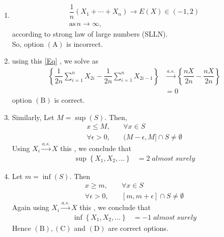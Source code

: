 \documentclass[journal,12pt,twocolumn]{IEEEtran}
\begin{document}
\begin{enumerate}[label=\alph*)]
\item\begin{align}
\dfrac{1}{n}\left(X_{1}+\cdots+X_{n}\right) \rightarrow E(X)\in(-1,2)\\
\text{as} \, n\rightarrow\infty,
\end{align}
according to strong law of large numbers (SLLN).\\
So, option $(\mathrm{A})$ is incorrect.
\item using this \ref{Eq} , we solve as
\begin{align}
\left\{\dfrac{1}{2 n} \sum_{i=1}^{n} X_{2 i}-\dfrac{1}{2 n} \sum_{i=1}^{n} X_{2 i-1}\right\}&\stackrel{a.s.}{\rightarrow}\left\{\dfrac{nX}{2 n}-\dfrac{nX}{2 n}\right\}\\
&=0
\end{align}
option $(\mathrm{B})$ is correct.
\item  Similarly, Let $M=\sup (S) .$ Then,
\begin{align}
x \leq M, &\quad \forall x \in S \\
\forall \epsilon>0,& \quad(M-\epsilon, M] \cap S \neq \emptyset
\end{align}
Using $X_i \stackrel{a.s.}{\rightarrow} X$ this , we  conclude that
\begin{align}
\sup \left\{X_{1}, X_{2}, \ldots\right\}&=2 \;almost\; surely
\end{align}
\item Let $m=\inf (S)$. Then
\begin{align}
x \geq m, & \quad \forall x \in S \\
\forall \epsilon>0, &\quad {[m, m+\epsilon] \cap S \neq \emptyset}
\end{align}
Again using $X_i \stackrel{a.s.}{\rightarrow} X$ this , we conclude that
\begin{align}
\inf \left\{X_{1}, X_{2}, \ldots\right\}&=-1 \;almost\; surely
\end{align}
Hence $(\mathrm{B}),(\mathrm{C})$ and $(\mathrm{D})$ are correct options.
\end{enumerate}
\end{document}
